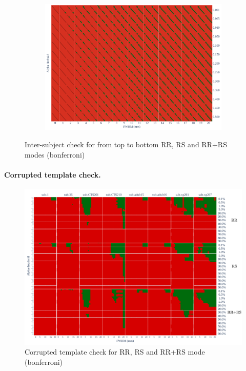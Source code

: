 \documentclass{article}
\begin{document}
\begin{figure}
\begin{subfigure}[t]{0.7\linewidth}
        \includegraphics[width=\linewidth]{figures/inter-subject/one_mct_fwe_bonferroni_RR-RS.pdf}
    \end{subfigure}
    \caption{Inter-subject check for from top to bottom RR, RS and RR+RS modes (bonferroni)}
    \label{fig:ieee-check}
\end{figure}

\paragraph{Corrupted template check.}

\begin{figure}
    \centering
    \includegraphics[width=\linewidth]{figures/template/template_fwe_bonferroni.pdf}
    \caption{Corrupted template check for RR, RS and RR+RS mode (bonferroni)}
    \label{fig:template_bonferroni}
\end{figure}
\end{document}
